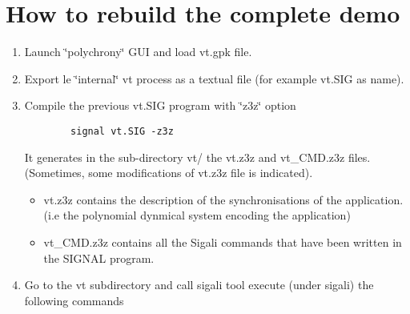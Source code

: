 \section{How to rebuild the complete demo}\label{index_sectB}
\begin{enumerate}
\item Launch \char`\"{}polychrony\char`\"{} GUI and load vt.gpk file.\item Export le \char`\"{}internal\char`\"{} vt process as a textual file (for example vt.SIG as name).\item Compile the previous vt.SIG program with \char`\"{}z3z\char`\"{} option \par
 

\footnotesize\begin{verbatim}		 signal vt.SIG -z3z
                \end{verbatim}
\normalsize
 It generates in the sub-directory vt/ the vt.z3z and vt\_\-CMD.z3z files. (Sometimes, some modifications of vt.z3z file is indicated).\begin{itemize}
\item vt.z3z contains the description of the synchronisations of the application. (i.e the polynomial dynmical system encoding the application)\item vt\_\-CMD.z3z contains all the Sigali commands that have been written in the SIGNAL program.\end{itemize}
\item Go to the vt subdirectory and call sigali tool execute (under sigali) the following commands 


\end{enumerate}
